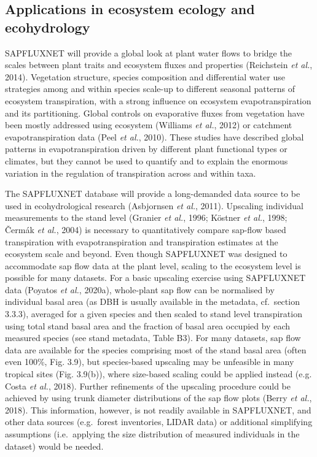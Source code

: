 \documentclass[11pt,twoside]{reedthesis}
\begin{document}
\subsection{Applications in ecosystem ecology and
ecohydrology}\label{applications-in-ecosystem-ecology-and-ecohydrology}

SAPFLUXNET will provide a global look at plant water flows to bridge the
scales between plant traits and ecosystem fluxes and properties
(Reichstein \emph{et al.}, 2014). Vegetation structure, species
composition and differential water use strategies among and within
species scale-up to different seasonal patterns of ecosystem
transpiration, with a strong influence on ecosystem evapotranspiration
and its partitioning. Global controls on evaporative fluxes from
vegetation have been mostly addressed using ecosystem (Williams \emph{et
al.}, 2012) or catchment evapotranspiration data (Peel \emph{et al.},
2010). These studies have described global patterns in
evapotranspiration driven by different plant functional types or
climates, but they cannot be used to quantify and to explain the
enormous variation in the regulation of transpiration across and within
taxa.\par

The SAPFLUXNET database will provide a long-demanded data source to be
used in ecohydrological research (Asbjornsen \emph{et al.}, 2011).
Upscaling individual measurements to the stand level (Granier \emph{et
al.}, 1996; Köstner \emph{et al.}, 1998; Čermák \emph{et al.}, 2004) is
necessary to quantitatively compare sap-flow based transpiration with
evapotranspiration and transpiration estimates at the ecosystem scale
and beyond. Even though SAPFLUXNET was designed to accommodate sap flow
data at the plant level, scaling to the ecosystem level is possible for
many datasets. For a basic upscaling exercise using SAPFLUXNET data
(Poyatos \emph{et al.}, 2020a), whole-plant sap flow can be normalised
by individual basal area (as DBH is usually available in the metadata,
cf.~section 3.3.3), averaged for a given species and then scaled to
stand level transpiration using total stand basal area and the fraction
of basal area occupied by each measured species (see stand metadata,
Table B3). For many datasets, sap flow data are available for the
species comprising most of the stand basal area (often even 100\%, Fig.
3.9), but species-based upscaling may be unfeasible in many tropical
sites (Fig. 3.9(b)), where size-based scaling could be applied instead
(e.g. Costa \emph{et al.}, 2018). Further refinements of the upscaling
procedure could be achieved by using trunk diameter distributions of the
sap flow plots (Berry \emph{et al.}, 2018). This information, however,
is not readily available in SAPFLUXNET, and other data sources
(e.g.~forest inventories, LIDAR data) or additional simplifying
assumptions (i.e.~applying the size distribution of measured individuals
in the dataset) would be needed.\par
\end{document}
